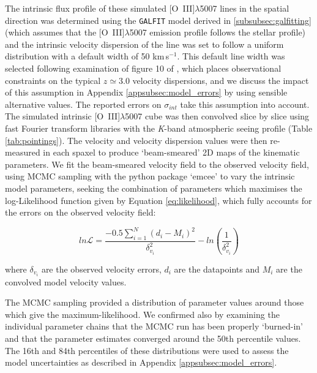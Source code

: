 \documentclass[fleqn,usenatbib]{mnras}
\newcommand{\Lagr}{\mathcal{L}}
\begin{document}
\noindent
The intrinsic flux profile of these simulated [O~{\sc III}]$\lambda$5007 lines in the spatial direction was determined using the {\tt GALFIT} model derived in \cref{subsubsec:galfitting} (which assumes that the [O~{\sc III}]$\lambda$5007 emission profile follows the stellar profile) and the intrinsic velocity dispersion of the line was set to follow a uniform distribution with a default width of 50 km\,s$^{-1}$.
This default line width was selected following examination of figure 10 of \cite{Wisnioski2015}, which places observational constraints on the typical $z\simeq3.0$ velocity dispersions, and we discuss the impact of this assumption in Appendix \ref{appsubsec:model_errors} by using sensible alternative values.
The reported errors on $\sigma_{int}$ take this assumption into account. \\

\noindent
The simulated intrinsic [O~{\sc III}]$\lambda$5007 cube was then convolved slice by slice using fast Fourier transform libraries with the {\it K}-band atmospheric seeing profile (Table \ref{tab:pointings}).
The velocity and velocity dispersion values were then re-measured in each spaxel to produce `beam-smeared' 2D maps of the kinematic parameters.
We fit the beam-smeared velocity field to the observed velocity field, using MCMC sampling with the python package `emcee' \citep{Foreman-Mackey2013} to vary the intrinsic model parameters, seeking the combination of parameters which maximises the log-Likelihood function given by Equation \ref{eq:likelihood}, which fully accounts for the errors on the observed velocity field:

\begin{equation}\label{eq:likelihood}
   ln\Lagr = \frac{-0.5\sum_{i=1}^{N}(d_{i} - M_{i})^{2}}{\delta_{v_{i}}^{2}} - ln\left(\frac{1}{\delta_{v_{i}}^{2}}\right)
\end{equation}

\noindent
where $\delta_{v_{i}}$ are the observed velocity errors, $d_{i}$ are the datapoints and $M_{i}$ are the convolved model velocity values.

The MCMC sampling provided a distribution of parameter values around those which give the maximum-likelihood.
We confirmed also by examining the individual parameter chains that the MCMC run has been properly `burned-in' and that the parameter estimates converged around the 50th percentile values.
The 16th and 84th percentiles of these distributions were used to assess the model uncertainties as described in Appendix \ref{appsubsec:model_errors}.
\end{document}
